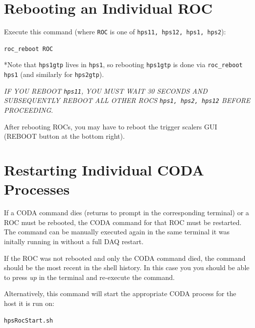 \documentclass[12pt]{article}
\begin{document}
\appendix
\section{Rebooting an Individual ROC}\label{sec:rebootaroc}
Execute this command (where \texttt{ROC} is one of \texttt{hps11, hps12, hps1, hps2}):\newline
\centerline{\texttt{roc\_reboot ROC}}

\vspace{5mm}\noindent
*Note that \texttt{hps1gtp} lives in \texttt{hps1}, so rebooting \texttt{hps1gtp} is done via \texttt{roc\_reboot hps1} (and similarly for \texttt{hps2gtp}).

\vspace{5mm}\noindent
{\em IF YOU REBOOT \texttt{hps11}, YOU MUST WAIT 30 SECONDS AND SUBSEQUENTLY REBOOT ALL OTHER ROCS \texttt{hps1, hps2, hps12} BEFORE PROCEEDING}.

    After rebooting ROCs, you may have to reboot the trigger scalers GUI (REBOOT button at the bottom right).
\section{Restarting Individual CODA Processes}\label{sec:codacommands}
If a CODA command dies (returns to prompt in the corresponding terminal) or a ROC must be rebooted, the CODA command for that ROC must be restarted.  The command can be manually executed again in the same terminal it was initally running in without a full DAQ restart.

If the ROC was not rebooted and only the CODA command died, the command should be the most recent in the shell history.  In this case you you should be able to press {\em up} in the terminal and re-execute the command.

Alternatively, this command will start the appropriate CODA process for the host it is run on:

\centerline{\texttt{hpsRocStart.sh}}

\end{document}
